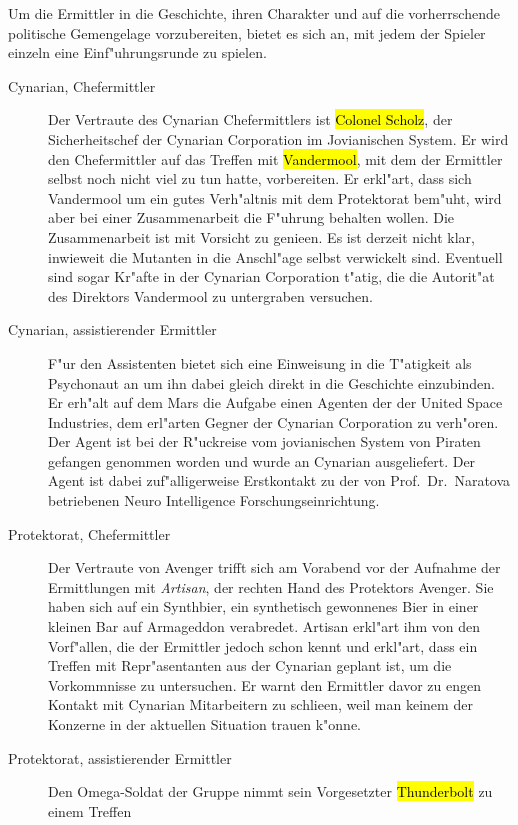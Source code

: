 
Um die Ermittler in die Geschichte, ihren Charakter und auf die vorherrschende politische Gemengelage vorzubereiten, bietet es sich an, mit jedem der Spieler einzeln eine Einf"uhrungsrunde zu spielen.

\begin{description}
	\item [Cynarian, Chefermittler] Der Vertraute des Cynarian Chefermittlers ist \hl{Colonel Scholz}, der Sicherheitschef der Cynarian 
		Corporation im Jovianischen System. Er wird den Chefermittler auf das Treffen mit \hl{Vandermool}, mit dem der Ermittler selbst noch nicht viel zu tun hatte, vorbereiten. Er erkl"art, dass sich Vandermool um ein gutes Verh"altnis mit dem Protektorat bem"uht, wird aber bei einer Zusammenarbeit die F"uhrung behalten wollen. Die Zusammenarbeit ist mit Vorsicht zu genie\3en. Es ist derzeit nicht klar, inwieweit die Mutanten in die Anschl"age selbst verwickelt sind. Eventuell sind sogar Kr"afte in der Cynarian Corporation t"atig, die die Autorit"at des Direktors Vandermool zu untergraben versuchen.
	\item [Cynarian, assistierender Ermittler] F"ur den Assistenten bietet sich eine Einweisung in die T"atigkeit als Psychonaut an um 
		ihn dabei gleich direkt in die Geschichte einzubinden. Er erh"alt auf dem Mars die Aufgabe einen Agenten der der United Space Industries, dem erl"arten Gegner der Cynarian Corporation zu verh"oren. Der Agent ist bei der R"uckreise vom jovianischen System von Piraten gefangen genommen worden und wurde an Cynarian ausgeliefert. Der Agent ist dabei zuf"alligerweise Erstkontakt zu der von Prof.~Dr.~Naratova betriebenen Neuro Intelligence Forschungseinrichtung.
	\item [Protektorat, Chefermittler] Der Vertraute von Avenger trifft sich am Vorabend vor der Aufnahme der Ermittlungen mit 
		\emph{Artisan}, der rechten Hand des Protektors Avenger. Sie haben sich auf ein Synthbier, ein synthetisch gewonnenes Bier in einer kleinen Bar auf Armageddon verabredet. Artisan erkl"art ihm von den Vorf"allen, die der Ermittler jedoch schon kennt und erkl"art, dass ein Treffen mit Repr"asentanten aus der Cynarian geplant ist, um die Vorkommnisse zu untersuchen. Er warnt den Ermittler davor zu engen Kontakt mit Cynarian Mitarbeitern zu schlie\3en, weil man keinem der Konzerne in der aktuellen Situation trauen k"onne.
	\item [Protektorat, assistierender Ermittler] Den Omega-Soldat der Gruppe nimmt sein Vorgesetzter \hl{Thunderbolt} zu einem Treffen 

\end{description}
